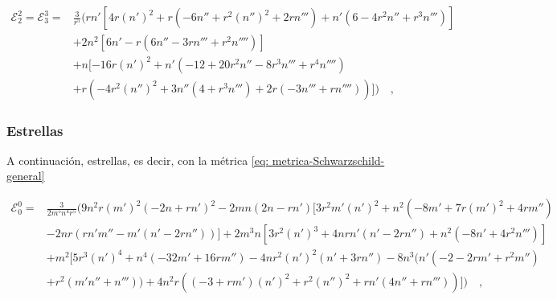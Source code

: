 \documentclass[12pt]{book}
\begin{document}
\begin{equation}
\begin{split}
    \mathcal{E}_2^2=\mathcal{E}^3_3=&\frac{3}{r^5}  ( r n'  [ 4 r (n')^2 + r  ( -6 n'' + r^2 (n'')^2 + 2 r n'''  ) + n'  ( 6 - 4 r^2 n'' + r^3 n'''  )  ] \\ & + 2 n^2  [ 6 n' - r  ( 6 n'' - 3 r n''' + r^2 n''''  )  ] \\ & + n  [ -16 r (n')^2 + n'  ( -12 + 20 r^2 n'' - 8 r^3 n''' + r^4 n''''  ) \\ & + r  ( -4 r^2 (n'')^2 + 3 n''  ( 4 + r^3 n'''  ) + 2 r  ( -3 n''' + r n''''  )  )  ]  ) \label{eq: ResultadosReales - cubico - BH - 33}\quad,
\end{split}
\end{equation}



\subsubsection{Estrellas}

A continuación, estrellas, es decir, con la métrica \eqref{eq: metrica-Schwarzschild-general}

\begin{equation}
\begin{split}
    \mathcal{E}_0^0=&\frac{3}{2 m^5 n^4 r^5} \Bigg( 9 n^2 r (m')^2 (-2 n + r n')^2 - 2 m n (2 n - r n')  [ 3 r^2 m' (n')^2 + n^2 (-8 m' + 7 r (m')^2 + 4 r m'') \\ & - 2 n r  ( r n' m'' - m' (n' - 2 r n'')  )  ] + 2 m^3 n  [ 3 r^2 (n')^3 + 4 n r n' (n' - 2 r n'') + n^2 (-8 n' + 4 r^2 n''')  ] \\ & + m^2  [ 5 r^3 (n')^4 + n^4 (-32 m' + 16 r m'') - 4 n r^2 (n')^2 (n' + 3 r n'') - 8 n^3  ( n' (-2 - 2 r m' + r^2 m'') \\ & + r^2 (m' n'' + n''')  ) + 4 n^2 r  ( (-3 + r m') (n')^2 + r^2 (n'')^2 + r n' (4 n'' + r n''')  )  ] \Bigg)\label{eq: ResultadosReales - cubico - S - 00}\quad,
\end{split}
\end{equation}
\end{document}
